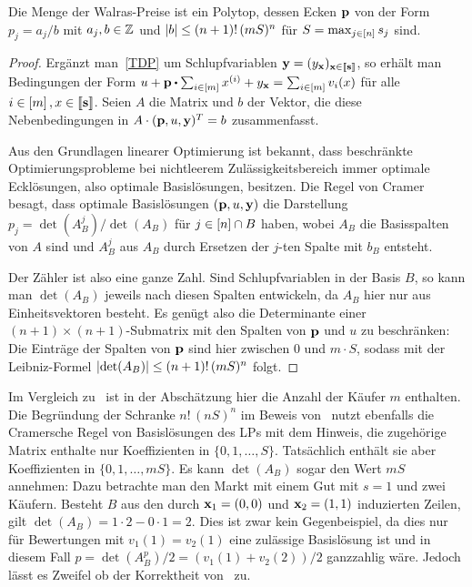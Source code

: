 \begin{lemma}\label{lemma-prices-bounded-S}
	Die Menge der Walras-Preise ist ein Polytop, dessen Ecken $\mathbf{p}$ von der Form $p_j = a_j/b$ mit $a_j,b\in\mathbb{Z}$ und
	$\left\lvert b \right\rvert \leq (n+1)!\, (mS)^n$
	für $S = \max_{j\in\left[ n \right]} s_j$ sind.
\end{lemma}
\begin{proof}
	Ergänzt man~\eqref{TDP} um Schlupfvariablen $\mathbf{y}=(y_{\mathbf{x}})_{\mathbf{x}\in\left\llbracket \mathbf{s} \right\rrbracket}$, so erhält man Bedingungen der Form $ u + \fp \bcdot \sum_{i\in\first{m}} x^{(i)} + y_{\fx} = \sum_{i\in\first{m}} v_i(x) $ für alle $i\in\left[ m \right], x\in\left\llbracket \mathbf{s} \right\rrbracket$.
	Seien $A$ die Matrix und $b$ der Vektor, die diese Nebenbedingungen in $A \cdot (\mathbf{p}, u, \mathbf{y})^T = b$ zusammenfasst.
	
	
	Aus den Grundlagen linearer Optimierung ist bekannt, dass beschränkte Optimierungsprobleme bei nichtleerem Zulässigkeitsbereich immer optimale Ecklösungen, also optimale Basislösungen, besitzen.
	Die Regel von Cramer besagt, dass optimale Basislösungen $(\mathbf{p}, u, \mathbf{y})$ die Darstellung $p_j = \det(A_B^j) / \det(A_B)$ für $j\in\left[ n \right]\cap B$ haben, wobei $A_B$ die Basisspalten von $A$ sind und $A_B^j$ aus $A_B$ durch Ersetzen der $j$-ten Spalte mit $b_B$ entsteht.
	
	Der Zähler ist also eine ganze Zahl.
	Sind Schlupfvariablen in der Basis $B$, so kann man $\det(A_B)$ jeweils nach diesen Spalten entwickeln, da $A_B$ hier nur aus Einheitsvektoren besteht.
	Es genügt also die Determinante einer $(n+1)\times(n+1)$-Submatrix mit den Spalten von $\mathbf{p}$ und $u$ zu beschränken:
 	Die Einträge der Spalten von $\mathbf{p}$ sind hier zwischen 0 und $m\cdot S$, sodass mit der Leibniz-Formel $\left\lvert \det(A_B) \right\rvert \leq (n+1)!\, (m S)^{n}$ folgt.
\end{proof}
\begin{bemerkung}
	Im Vergleich zu~\cite[Lemma~5]{PaesLeme2018} ist in der Abschätzung hier die Anzahl der Käufer $m$ enthalten.
	Die Begründung der Schranke $n!\,(nS)^n$ im Beweis von~\cite[Lemma~5]{PaesLeme2018} nutzt ebenfalls die Cramersche Regel von Basislösungen des LPs mit dem Hinweis, die zugehörige Matrix enthalte nur Koeffizienten in $\{0, 1,\dots, S\}$.
	Tatsächlich enthält sie aber Koeffizienten in $\{0, 1, \dots, mS \}$.
	Es kann $\det(A_B)$ sogar den Wert $mS$ annehmen: Dazu betrachte man den Markt mit einem Gut mit $s=1$ und zwei Käufern.
	Besteht $B$ aus den durch $\mathbf{x}_1 = (0,0)$ und $\mathbf{x}_2= (1,1)$ induzierten Zeilen, gilt $\det(A_B) = 1\cdot 2 - 0 \cdot 1 = 2$.
	Dies ist zwar kein Gegenbeispiel, da dies nur für Bewertungen mit $v_1(1) = v_2(1)$ eine zulässige Basislösung ist und in diesem Fall $p = \det({A_B^p}) / 2 = (v_1(1) + v_2(2)) / 2$ ganzzahlig wäre.
	Jedoch lässt es Zweifel ob der Korrektheit von~\cite[Lemma~5]{PaesLeme2018} zu.
\end{bemerkung}



